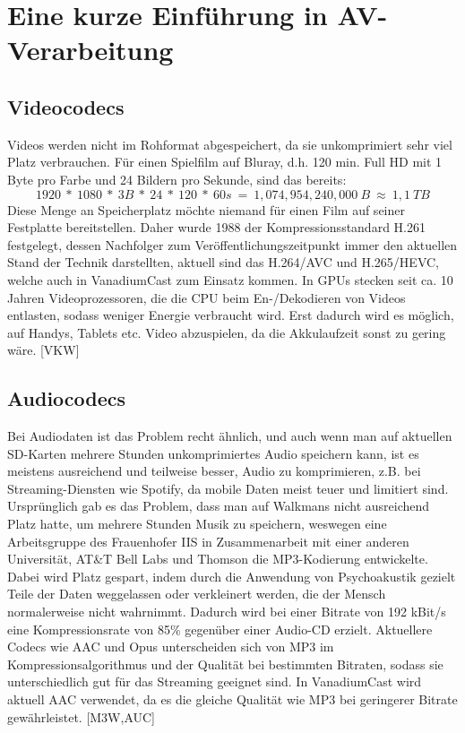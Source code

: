 \documentclass{article}
\begin{document}
    \newpage


    \section{Eine kurze Einführung in AV-Verarbeitung}\label{sec:eine-kurze-einführung-in-av-verarbeitung}

    \subsection{Videocodecs}\label{subsec:videocodecs}

    Videos werden nicht im Rohformat abgespeichert, da sie unkomprimiert
    sehr viel Platz verbrauchen. Für einen Spielfilm auf Bluray, d.h. 120
    min. Full HD mit 1 Byte pro Farbe und 24 Bildern pro Sekunde, sind das
    bereits:
    \[1920\ *\ 1080\ *\ 3B\ *\ 24\ *\ 120\ *\ 60s\ =\ 1,074,954,240,000\ B\ \approx\ 1,1\ TB\]
    Diese Menge an Speicherplatz möchte niemand für einen Film auf seiner
    Festplatte bereitstellen. Daher wurde 1988 der Kompressionsstandard
    H.261 festgelegt, dessen Nachfolger zum Veröffentlichungszeitpunkt immer
    den aktuellen Stand der Technik darstellten, aktuell sind das H.264/AVC
    und H.265/HEVC, welche auch in VanadiumCast zum Einsatz kommen. In GPUs
    stecken seit ca. 10 Jahren Videoprozessoren, die die CPU beim
    En-/Dekodieren von Videos entlasten, sodass weniger Energie verbraucht
    wird. Erst dadurch wird es möglich, auf Handys, Tablets etc. Video
    abzuspielen, da die Akkulaufzeit sonst zu gering wäre. [VKW]

    \subsection{Audiocodecs}\label{subsec:audiocodecs}

    Bei Audiodaten ist das Problem recht ähnlich, und auch wenn man auf
    aktuellen SD-Karten mehrere Stunden unkomprimiertes Audio speichern
    kann, ist es meistens ausreichend und teilweise besser, Audio zu
    komprimieren, z.B. bei Streaming-Diensten wie Spotify, da mobile Daten
    meist teuer und limitiert sind. Ursprünglich gab es das Problem, dass
    man auf Walkmans nicht ausreichend Platz hatte, um mehrere Stunden Musik
    zu speichern, weswegen eine Arbeitsgruppe des Frauenhofer IIS in
    Zusammenarbeit mit einer anderen Universität, AT\&T Bell Labs und
    Thomson die MP3-Kodierung entwickelte. Dabei wird Platz gespart, indem
    durch die Anwendung von Psychoakustik gezielt Teile der Daten
    weggelassen oder verkleinert werden, die der Mensch normalerweise nicht
    wahrnimmt. Dadurch wird bei einer Bitrate von 192 kBit/s eine
    Kompressionsrate von 85\% gegenüber einer Audio-CD erzielt. Aktuellere
    Codecs wie AAC und Opus unterscheiden sich von MP3 im
    Kompressionsalgorithmus und der Qualität bei bestimmten Bitraten, sodass
    sie unterschiedlich gut für das Streaming geeignet sind. In VanadiumCast
    wird aktuell AAC verwendet, da es die gleiche Qualität wie MP3 bei
    geringerer Bitrate gewährleistet. [M3W,AUC]
\end{document}
